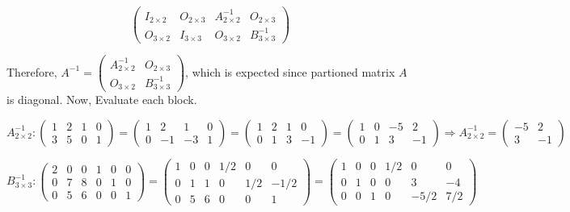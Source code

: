 \documentclass{article}
\begin{document}
\begin{equation*}
  \left(
    \begin{array}{c|c|c|c}
      I_{2\times2} & O_{2\times3} & A_{2\times2}^{-1} & O_{2\times3} \\ \hline
      O_{3\times2} & I_{3\times3} & O_{3\times2} & B_{3\times3}^{-1}
    \end{array}
  \right)
\end{equation*}

Therefore, $A^{-1} = \left(
    \begin{array}{c|c}
      A_{2\times2}^{-1} & O_{2\times3} \\ \hline
      O_{3\times2} & B_{3\times3}^{-1}
    \end{array}
  \right)$, which is expected since partioned matrix $A$ is diagonal. Now, Evaluate each block.

\begin{equation*}
  A_{2\times2}^{-1}:
  \begin{pmatrix}
    1 & 2 & 1 & 0 \\
    3 & 5 & 0 & 1
  \end{pmatrix} =
  \begin{pmatrix}
    1 & 2 & 1 & 0 \\
    0 & -1 & -3 & 1
  \end{pmatrix} = 
  \begin{pmatrix}
    1 & 2 & 1 & 0 \\
    0 & 1 & 3 & -1
  \end{pmatrix} =
  \begin{pmatrix}
    1 & 0 & -5 & 2 \\
    0 & 1 & 3 & -1
  \end{pmatrix} \Rightarrow A_{2\times2}^{-1} =
  \begin{pmatrix}
    -5 & 2 \\
    3 & -1
  \end{pmatrix}
\end{equation*}

\begin{equation*}
  B_{3\times3}^{-1}:
  \begin{pmatrix}
    2 & 0 & 0 & 1 & 0 & 0 \\
    0 & 7 & 8 & 0 & 1 & 0 \\
    0 & 5 & 6 & 0 & 0 & 1
  \end{pmatrix} =
  \begin{pmatrix}
    1 & 0 & 0 & 1/2 & 0 & 0 \\
    0 & 1 & 1 & 0 & 1/2 & -1/2 \\
    0 & 5 & 6 & 0 & 0 & 1
  \end{pmatrix} =
    \begin{pmatrix}
    1 & 0 & 0 & 1/2 & 0 & 0 \\
    0 & 1 & 0 & 0 & 3 & -4 \\
    0 & 0 & 1 & 0 & -5/2 & 7/2
    \end{pmatrix}
  \end{equation*}
\end{document}
